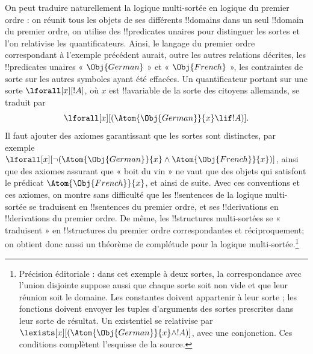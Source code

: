\documentclass[../../../include/open-logic-section]{subfiles}
\begin{document}
On peut traduire naturellement la logique multi-sortée en logique du
premier ordre : on réunit tous les objets de ses différents
!!{domain}s dans un seul !!{domain} du premier ordre, on utilise des
!!{predicate}s unaires pour distinguer les sortes et l'on relativise
les quantificateurs. Ainsi, le langage du premier ordre correspondant
à l'exemple précédent aurait, outre les autres relations décrites,
les !!{predicate}s unaires « $\Obj{German}$ » et
« $\Obj{French}$ », les contraintes de sorte sur les autres
symboles ayant été effacées. Un quantificateur portant sur une sorte
$\lforall[x][!A]$, où $x$ est !!a{variable} de la sorte des citoyens allemands,
se traduit par
\[
\lforall[x][(\Atom{\Obj{German}}{x} \lif !A)].
\]
Il faut ajouter des axiomes garantissant que les sortes sont
distinctes, par exemple
$\lforall[x][\lnot (\Atom{\Obj{German}}{x} \land
  \Atom{\Obj{French}}{x})]$, ainsi que des axiomes assurant que
« boit du vin » ne vaut que des objets qui satisfont le prédicat
$\Atom{\Obj{French}}{x}$, et ainsi de suite. Avec ces conventions
et ces axiomes, on montre sans difficulté que les !!{sentence}s de
la logique multi-sortée se traduisent en !!{sentence}s du premier
ordre, et ses !!{derivation}s en !!{derivation}s du premier ordre.
De même, les !!{structure}s multi-sortées se « traduisent » en
!!{structure}s du premier ordre correspondantes et réciproquement;
on obtient donc aussi un théorème de complétude pour la logique
multi-sortée.\footnote{Précision éditoriale : dans cet exemple à deux sortes, la correspondance avec l'union disjointe suppose aussi que chaque sorte soit non vide et que leur réunion soit le domaine. Les constantes doivent appartenir à leur sorte ; les fonctions doivent envoyer les tuples d'arguments des sortes prescrites dans leur sorte de résultat. Un existentiel se relativise par $\lexists[x][(\Atom{\Obj{German}}{x}\land !A)]$, avec une conjonction. Ces conditions complètent l'esquisse de la source.}
\end{document}
